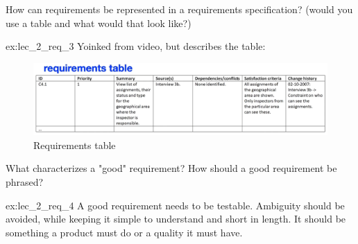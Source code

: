\begin{exercise}{\parbox{\linewidth*3/4}{How can requirements be represented in a requirements specification? (would you use a table and what would that look like?)}}{ex:lec_2_req_3}
    Yoinked from video, but describes the table:
    \begin{figure}[H]
        \begin{center}
            \includegraphics*[width=\linewidth*3/4]{chapters/requirement_analysis/figures/requirement_table.png}        
        \end{center}
        \caption{Requirements table}
        \label{fig:requirement_table}
    \end{figure}
\end{exercise}
\begin{exercise}{\parbox{\linewidth*3/4}{What characterizes a "good" requirement? How should a good requirement be phrased?}}{ex:lec_2_req_4}
    A good requirement needs to be testable. Ambiguity should be avoided, while keeping it simple to understand and short in length. It should be something a product must do or a quality it must have.
\end{exercise}
